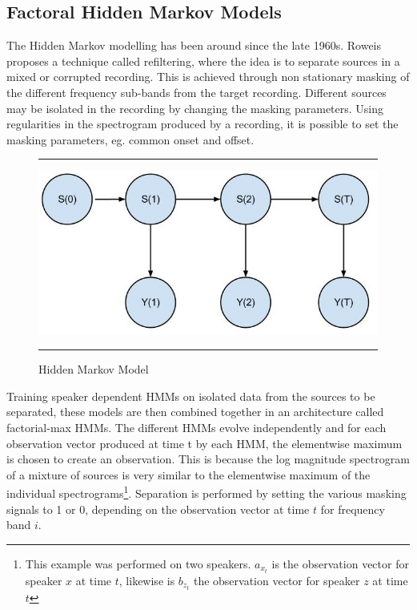 \newpage
\subsection{Factoral Hidden Markov Models} %
The Hidden Markov modelling has been around since the late 1960s. Roweis\cite{roweisOneMic} proposes a technique called refiltering, where the idea is to separate sources in a mixed or corrupted recording. This is achieved through non stationary masking of the different frequency sub-bands from the target recording. Different sources may be isolated in the recording by changing the masking parameters. Using regularities in the spectrogram produced by a recording, it is possible to set the masking parameters, eg. common onset and offset.

\begin{figure}[h]
  \centering
  \hrule
  \includegraphics[width = .9\textwidth]{hmm}
  \hrule
  \caption{Hidden Markov Model}
  \label{hmm_figure}
\end{figure}



Training speaker dependent HMMs on isolated data from the sources to be separated, these models are then combined together in an architecture called factorial-max HMMs. The different HMMs evolve independently and for each observation vector produced at time t by each HMM, the elementwise maximum is chosen to create an observation. This is because the log magnitude spectrogram of a mixture of sources is very similar to the elementwise maximum of the individual spectrograms\footnote{This example was performed on two speakers. $a_{x_{t}}$ is the observation vector for speaker $x$ at time $t$, likewise is $b_{z_{t}}$ the observation vector for speaker $z$ at time $t$}. Separation is performed by setting the various masking signals to 1 or 0, depending on the observation vector at time $t$ for frequency band $i$.

